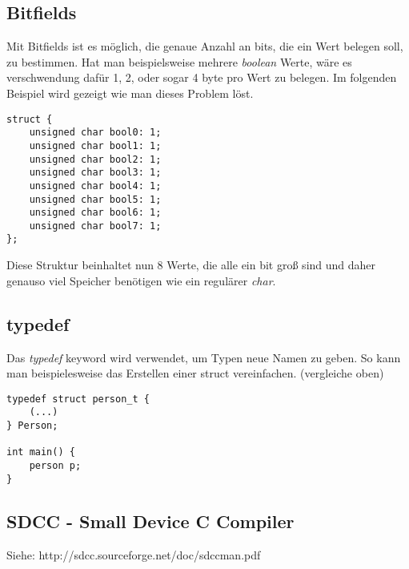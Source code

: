 \documentclass{article}
\begin{document}
\subsection{Bitfields}
Mit Bitfields ist es möglich, die genaue Anzahl an bits, die ein Wert belegen soll, zu bestimmen. Hat man beispielsweise mehrere \textit{boolean} Werte, wäre es verschwendung dafür 1, 2, oder sogar 4 byte pro Wert zu belegen. Im folgenden Beispiel wird gezeigt wie man dieses Problem löst.
\begin{verbatim}
struct {
    unsigned char bool0: 1;
    unsigned char bool1: 1;
    unsigned char bool2: 1;
    unsigned char bool3: 1;
    unsigned char bool4: 1;
    unsigned char bool5: 1;
    unsigned char bool6: 1;
    unsigned char bool7: 1;
};
\end{verbatim}
Diese Struktur beinhaltet nun 8 Werte, die alle ein bit groß sind und daher genauso viel Speicher benötigen wie ein regulärer \textit{char}.

\subsection{typedef}
Das \textit{typedef} keyword wird verwendet, um Typen neue Namen zu geben. So kann man beispielesweise das Erstellen einer struct vereinfachen. (vergleiche oben)
\begin{verbatim}
typedef struct person_t {
    (...)
} Person;

int main() {
    person p;
}
\end{verbatim}

\subsection{SDCC - Small Device C Compiler}

Siehe: http://sdcc.sourceforge.net/doc/sdccman.pdf
\end{document}
